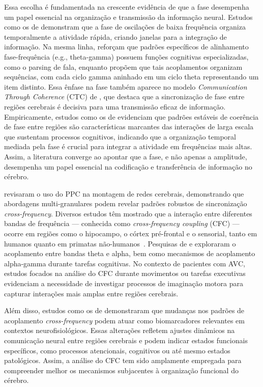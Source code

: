 Essa escolha é fundamentada na crescente evidência de que a fase desempenha um papel essencial na organização e transmissão da informação neural. Estudos como os de  demonstram que a fase de oscilações de baixa frequência organiza temporalmente a atividade rápida, criando janelas para a integração de informação. Na mesma linha,  reforçam que padrões específicos de alinhamento fase-frequência (e.g., theta-gamma) possuem funções cognitivas especializadas, como o parsing de fala, enquanto  propõem que tais acoplamentos organizam sequências, com cada ciclo gamma aninhado em um ciclo theta representando um item distinto. Essa ênfase na fase também aparece no modelo \textit{Communication Through Coherence} (CTC) de , que destaca que a sincronização de fase entre regiões cerebrais é decisiva para uma transmissão eficaz de informação. Empiricamente, estudos como os de  evidenciam que padrões estáveis de coerência de fase entre regiões são características marcantes das interações de larga escala que sustentam processos cognitivos, indicando que a organização temporal mediada pela fase é crucial para integrar a atividade em frequências mais altas. Assim, a literatura converge ao apontar que a fase, e não apenas a amplitude, desempenha um papel essencial na codificação e transferência de informação no cérebro.

 revisaram o uso do PPC na montagem de redes cerebrais, demonstrando que abordagens multi-granulares podem revelar padrões robustos de sincronização \textit{cross-frequency}. Diversos estudos têm mostrado que a interação entre diferentes bandas de frequência --- conhecida como \textit{cross-frequency coupling} (CFC) --- ocorre em regiões como o hipocampo, o córtex pré-frontal e o sensorial, tanto em humanos quanto em primatas não-humanos~\cite{mormann2005phase, canolty2006high, jensen2007cross, khamechian2020decoding}. Pesquisas de  e  exploraram o acoplamento entre bandas theta e alpha, bem como mecanismos de acoplamento alpha-gamma durante tarefas cognitivas. No contexto de pacientes com AVC, estudos focados na análise do CFC durante movimentos ou tarefas executivas evidenciam a necessidade de investigar processos de imaginação motora para capturar interações mais amplas entre regiões cerebrais.

Além disso, estudos como os de  demonstraram que mudanças nos padrões de acoplamento \textit{cross-frequency} podem atuar como biomarcadores relevantes em contextos neurofisiológicos. Essas alterações refletem ajustes dinâmicos na comunicação neural entre regiões cerebrais e podem indicar estados funcionais específicos, como processos atencionais, cognitivos ou até mesmo estados patológicos. Assim, a análise do CFC tem sido amplamente empregada para compreender melhor os mecanismos subjacentes à organização funcional do cérebro.

